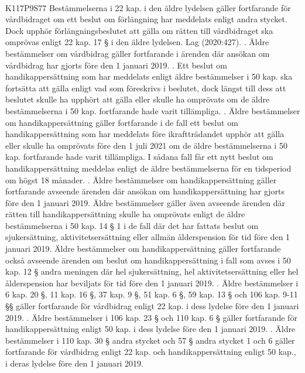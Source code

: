 \documentclass[a4paper,notitlepage,openany,10pt]{book}
\begin{document}
\paragraph*{}
{\tiny K117P9S77}
Bestämmelserna i 22 kap. i den äldre lydelsen gäller fortfarande för vårdbidraget om ett beslut om förlängning har meddelats enligt andra stycket. Dock upphör förlängningsbeslutet att gälla om rätten till vårdbidraget ska omprövas enligt 22 kap. 17 § i den äldre lydelsen.
Lag (2020:427).
. Äldre bestämmelser om vårdbidrag gäller fortfarande i ärenden där ansökan om vårdbidrag har gjorts före den 1 januari 2019.
. Ett beslut om handikappersättning som har meddelats enligt äldre bestämmelser i 50 kap. ska fortsätta att gälla enligt vad som föreskrivs i beslutet, dock längst till dess att beslutet skulle ha upphört att gälla eller skulle ha omprövats om de äldre bestämmelserna i 50 kap. fortfarande hade varit tillämpliga.
. Äldre bestämmelser om handikappersättning gäller fortfarande i de fall ett beslut om handikappersättning som har meddelats före ikraftträdandet upphör att gälla eller skulle ha omprövats före den 1 juli 2021 om de äldre bestämmelserna i 50 kap. fortfarande hade varit tillämpliga. I sådana fall får ett nytt beslut om handikappersättning meddelas enligt de äldre bestämmelserna för en tidsperiod om högst 18 månader.
. Äldre bestämmelser om handikappersättning gäller fortfarande avseende ärenden där ansökan om handikappersättning har gjorts före den 1 januari 2019. Äldre bestämmelser gäller även avseende ärenden där rätten till handikappersättning skulle ha omprövats enligt de äldre bestämmelserna i 50 kap. 14 § 1 i de fall där det har fattats beslut om sjukersättning, aktivitetsersättning eller allmän ålderspension för tid före den 1 januari 2019. Äldre bestämmelser om handikappersättning gäller fortfarande också avseende ärenden om beslut om handikappersättning i fall som avses i 50 kap. 12 § andra meningen där hel sjukersättning, hel aktivitetsersättning eller hel ålderspension har beviljats för tid före den 1 januari 2019.
. Äldre bestämmelser i 6 kap. 20 §, 11 kap. 16 §, 37 kap. 9 §, 51 kap. 6 §, 59 kap. 13 § och 106 kap. 9-11 §§ gäller fortfarande för vårdbidrag enligt 22 kap. i dess lydelse före den 1 januari 2019.
. Äldre bestämmelser i 106 kap. 23 § och 110 kap. 6 § gäller fortfarande för handikappersättning enligt 50 kap. i dess lydelse före den 1 januari 2019.
. Äldre bestämmelser i 110 kap. 30 § andra stycket och 57 § andra stycket 1 och 6 gäller fortfarande för vårdbidrag enligt 22 kap. och handikappersättning enligt 50 kap., i deras lydelse före den 1 januari 2019.
\end{document}

